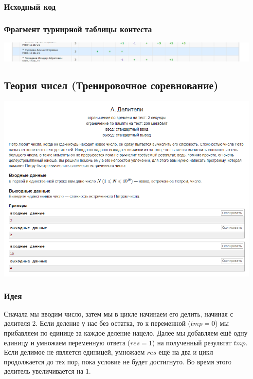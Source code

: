 \subsubsection*{Исходный код}



\subsubsection*{Фрагмент турнирной таблицы контеста}
\begin{center} 
\includegraphics[scale=0.5]{standings/4.png}\newline\noindent
\end{center} 
\pagebreak

\subsection*{Теория чисел (Тренировочное соревнование)}
\begin{center} 
\includegraphics[scale=0.75]{statements/5_A.png}
\end{center} 
\subsubsection*{Идея}
Сначала мы вводим число, затем мы в цикле начинаем его делить, начиная с делителя 2. Если деление у нас без остатка, то к переменной ($tmp = 0$) мы прибавляем по единице за каждое деление нацело. Далее мы добавляем ещё одну единицу и умножаем переменную ответа ($res = 1$) на полученный результат $tmp$. Если делимое не является единицей, умножаем $res$ ещё на два и цикл продолжается до тех пор, пока условие не будет достигнуто. Во время этого делитель увеличивается на 1.
